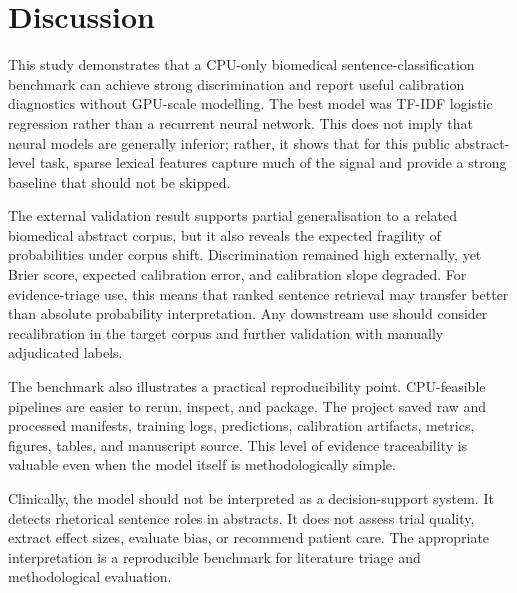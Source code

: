 \section*{Discussion}
This study demonstrates that a CPU-only biomedical sentence-classification benchmark can achieve strong discrimination and report useful calibration diagnostics without GPU-scale modelling. The best model was TF-IDF logistic regression rather than a recurrent neural network. This does not imply that neural models are generally inferior; rather, it shows that for this public abstract-level task, sparse lexical features capture much of the signal and provide a strong baseline that should not be skipped.

The external validation result supports partial generalisation to a related biomedical abstract corpus, but it also reveals the expected fragility of probabilities under corpus shift. Discrimination remained high externally, yet Brier score, expected calibration error, and calibration slope degraded. For evidence-triage use, this means that ranked sentence retrieval may transfer better than absolute probability interpretation. Any downstream use should consider recalibration in the target corpus and further validation with manually adjudicated labels.

The benchmark also illustrates a practical reproducibility point. CPU-feasible pipelines are easier to rerun, inspect, and package. The project saved raw and processed manifests, training logs, predictions, calibration artifacts, metrics, figures, tables, and manuscript source. This level of evidence traceability is valuable even when the model itself is methodologically simple.

Clinically, the model should not be interpreted as a decision-support system. It detects rhetorical sentence roles in abstracts. It does not assess trial quality, extract effect sizes, evaluate bias, or recommend patient care. The appropriate interpretation is a reproducible benchmark for literature triage and methodological evaluation.
